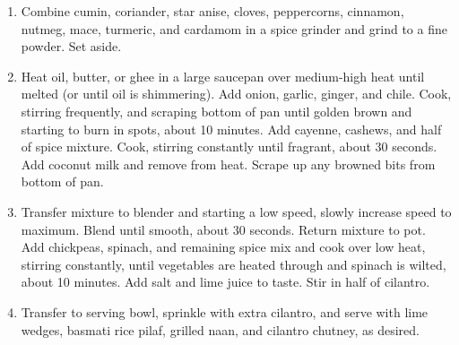 \begin{enumerate}
    \item Combine cumin, coriander, star anise, cloves, peppercorns, cinnamon, nutmeg, mace, turmeric, and cardamom in a spice grinder and grind to a fine powder. Set aside.
    \item Heat oil, butter, or ghee in a large saucepan over medium-high heat until melted (or until oil is shimmering). Add onion, garlic, ginger, and chile. Cook, stirring frequently, and scraping bottom of pan until golden brown and starting to burn in spots, about 10 minutes. Add cayenne, cashews, and half of spice mixture. Cook, stirring constantly until fragrant, about 30 seconds. Add coconut milk and remove from heat. Scrape up any browned bits from bottom of pan.
    \item Transfer mixture to blender and starting a low speed, slowly increase speed to maximum. Blend until smooth, about 30 seconds. Return mixture to pot. Add chickpeas, spinach, and remaining spice mix and cook over low heat, stirring constantly, until vegetables are heated through and spinach is wilted, about 10 minutes. Add salt and lime juice to taste. Stir in half of cilantro.
    \item Transfer to serving bowl, sprinkle with extra cilantro, and serve with lime wedges, basmati rice pilaf, grilled naan, and cilantro chutney, as desired.
\end{enumerate}
